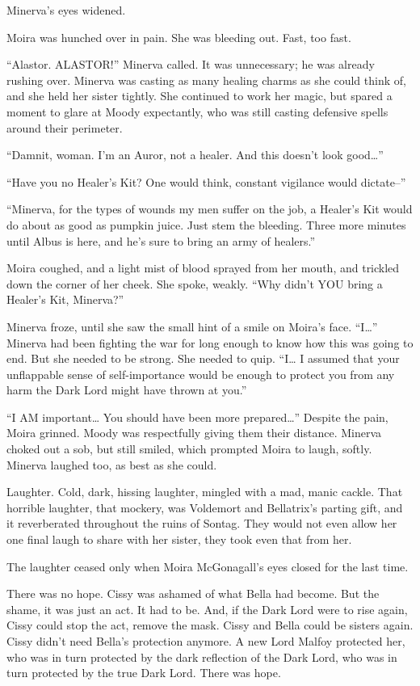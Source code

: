 Minerva’s eyes widened.

Moira was hunched over in pain. She was bleeding out. Fast, too fast.

“Alastor. ALASTOR!” Minerva called. It was unnecessary; he was already rushing over. Minerva was casting as many healing charms as she could think of, and she held her sister tightly. She continued to work her magic, but spared a moment to glare at Moody expectantly, who was still casting defensive spells around their perimeter.

“Damnit, woman. I’m an Auror, not a healer. And this doesn’t look good…”

“Have you no Healer’s Kit? One would think, constant vigilance would dictate–”

“Minerva, for the types of wounds my men suffer on the job, a Healer’s Kit would do about as good as pumpkin juice. Just stem the bleeding. Three more minutes until Albus is here, and he’s sure to bring an army of healers.”

Moira coughed, and a light mist of blood sprayed from her mouth, and trickled down the corner of her cheek. She spoke, weakly. “Why didn’t YOU bring a Healer’s Kit, Minerva?”

Minerva froze, until she saw the small hint of a smile on Moira’s face. “I…” Minerva had been fighting the war for long enough to know how this was going to end. But she needed to be strong. She needed to quip. “I… I assumed that your unflappable sense of self-importance would be enough to protect you from any harm the Dark Lord might have thrown at you.”

“I AM important… You should have been more prepared…” Despite the pain, Moira grinned. Moody was respectfully giving them their distance. Minerva choked out a sob, but still smiled, which prompted Moira to laugh, softly. Minerva laughed too, as best as she could.

Laughter. Cold, dark, hissing laughter, mingled with a mad, manic cackle. That horrible laughter, that mockery, was Voldemort and Bellatrix’s parting gift, and it reverberated throughout the ruins of Sontag. They would not even allow her one final laugh to share with her sister, they took even that from her.

The laughter ceased only when Moira McGonagall’s eyes closed for the last time.
\simpleline


There was no hope. Cissy was ashamed of what Bella had become. But the shame, it was just an act. It had to be. And, if the Dark Lord were to rise again, Cissy could stop the act, remove the mask. Cissy and Bella could be sisters again. Cissy didn’t need Bella’s protection anymore. A new Lord Malfoy protected her, who was in turn protected by the dark reflection of the Dark Lord, who was in turn protected by the true Dark Lord. There was hope.

